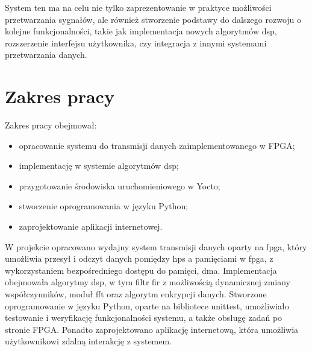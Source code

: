 System ten ma na celu nie tylko zaprezentowanie w praktyce możliwości przetwarzania sygnałów, ale również stworzenie podstawy do dalszego rozwoju o kolejne funkcjonalności, takie jak implementacja nowych algorytmów \ac{dsp}, rozszerzenie interfejsu użytkownika, czy integracja z innymi systemami przetwarzania danych.

\section*{Zakres pracy}
\label{sec:zakresPracy}
Zakres pracy obejmował:
\begin{itemize}
    \item opracowanie systemu do transmisji danych zaimplementowanego w FPGA;
    \item implementację w systemie algorytmów \ac{dsp};
    \item przygotowanie środowiska uruchomieniowego w Yocto;
    \item stworzenie oprogramowania w języku Python;
    \item zaprojektowanie aplikacji internetowej.
\end{itemize}

W projekcie opracowano wydajny system transmisji danych oparty na \ac{fpga}, który umożliwia przesył i odczyt danych pomiędzy \ac{hps} a pamięciami w \ac{fpga}, z wykorzystaniem bezpośredniego dostępu do pamięci, \ac{dma}. Implementacja obejmowała algorytmy \ac{dsp}, w tym filtr \ac{fir} z możliwością dynamicznej zmiany współczynników, moduł \ac{fft} oraz algorytm enkrypcji danych. Stworzone oprogramowanie w języku Python, oparte na bibliotece unittest, umożliwiało testowanie i weryfikację funkcjonalności systemu, a także obsługę zadań po stronie FPGA. Ponadto zaprojektowano aplikację internetową, która umożliwia użytkownikowi zdalną interakcję z systemem.

